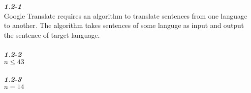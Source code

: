 \textbf{\textsl{1.2-1}} \\
Google Translate requires an algorithm to translate sentences
from one language to another. The algorithm takes sentences of some
languge as input and output the sentence of target language.\\
\\
\textbf{\textsl{1.2-2}} \\
$n \le 43$\\
\\
\textbf{\textsl{1.2-3}} \\
$n = 14$\\
\\
